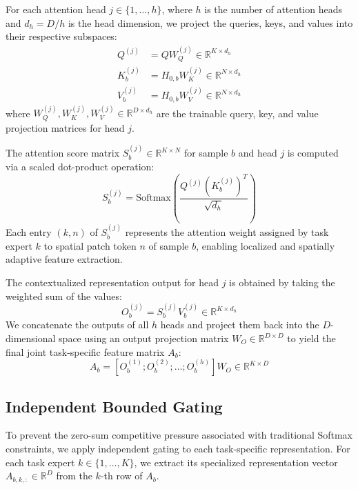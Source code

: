 For each attention head $j \in \{1, \dots, h\}$, where $h$ is the number of attention heads and $d_h = D/h$ is the head dimension, we project the queries, keys, and values into their respective subspaces:
\begin{align}
    Q^{(j)} &= Q W_Q^{(j)} \in \mathbb{R}^{K \times d_h} \\
    K_{b}^{(j)} &= H_{0, b} W_K^{(j)} \in \mathbb{R}^{N \times d_h} \\
    V_{b}^{(j)} &= H_{0, b} W_V^{(j)} \in \mathbb{R}^{N \times d_h}
\end{align}
where $W_Q^{(j)}, W_K^{(j)}, W_V^{(j)} \in \mathbb{R}^{D \times d_h}$ are the trainable query, key, and value projection matrices for head $j$.

The attention score matrix $S_{b}^{(j)} \in \mathbb{R}^{K \times N}$ for sample $b$ and head $j$ is computed via a scaled dot-product operation:
\begin{equation}
    S_{b}^{(j)} = \text{Softmax}\left( \frac{Q^{(j)} (K_{b}^{(j)})^T}{\sqrt{d_h}} \right)
\end{equation}
Each entry $(k, n)$ of $S_{b}^{(j)}$ represents the attention weight assigned by task expert $k$ to spatial patch token $n$ of sample $b$, enabling localized and spatially adaptive feature extraction.

The contextualized representation output for head $j$ is obtained by taking the weighted sum of the values:
\begin{equation}
    O_{b}^{(j)} = S_{b}^{(j)} V_{b}^{(j)} \in \mathbb{R}^{K \times d_h}
\end{equation}
We concatenate the outputs of all $h$ heads and project them back into the $D$-dimensional space using an output projection matrix $W_O \in \mathbb{R}^{D \times D}$ to yield the final joint task-specific feature matrix $A_b$:
\begin{equation}
    A_b = \left[ O_{b}^{(1)}; O_{b}^{(2)}; \dots; O_{b}^{(h)} \right] W_O \in \mathbb{R}^{K \times D}
\end{equation}

\subsection{Independent Bounded Gating}
To prevent the zero-sum competitive pressure associated with traditional Softmax constraints, we apply independent gating to each task-specific representation. For each task expert $k \in \{1, \dots, K\}$, we extract its specialized representation vector $A_{b, k, :} \in \mathbb{R}^D$ from the $k$-th row of $A_b$.

